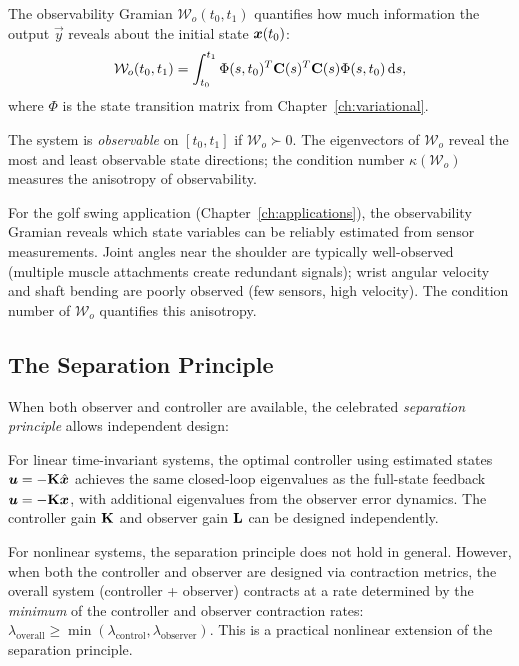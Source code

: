 The observability Gramian $\mathcal{W}_o(t_0, t_1)$ quantifies how much information the
output $\vec{y}$ reveals about the initial state $\bm{x}(t_0)$:
\begin{equation}
\mathcal{W}_o(t_0, t_1) = \int_{t_0}^{t_1} \Phi(s, t_0)^T \mathbf{C}(s)^T \mathbf{C}(s) \Phi(s, t_0) \, \mathrm{d} s,
\label{eq:ch6:obs-gramian}
\end{equation}
where $\Phi$ is the state transition matrix from Chapter~\ref{ch:variational}.

The system is \emph{observable} on $[t_0, t_1]$ if $\mathcal{W}_o \succ 0$. The
eigenvectors of $\mathcal{W}_o$ reveal the most and least observable state directions;
the condition number $\kappa(\mathcal{W}_o)$ measures the anisotropy of observability.

\begin{warningbox}
For the golf swing application (Chapter~\ref{ch:applications}), the observability
Gramian reveals which state variables can be reliably estimated from sensor measurements.
Joint angles near the shoulder are typically well-observed (multiple muscle attachments
create redundant signals); wrist angular velocity and shaft bending are poorly observed
(few sensors, high velocity). The condition number of $\mathcal{W}_o$ quantifies this
anisotropy.
\end{warningbox}

\subsection{The Separation Principle}

When both observer and controller are available, the celebrated \emph{separation principle}
allows independent design:

\begin{theorem}
\label{thm:ch6:separation}
For linear time-invariant systems, the optimal controller using estimated states
$\bm{u} = -\mathbf{K}\hat{\bm{x}}$ achieves the same closed-loop eigenvalues as the full-state
feedback $\bm{u} = -\mathbf{K}\bm{x}$, with additional eigenvalues from the observer error
dynamics. The controller gain $\mathbf{K}$ and observer gain $\mathbf{L}$ can be designed
independently.
\end{theorem}

For nonlinear systems, the separation principle does not hold in general. However,
when both the controller and observer are designed via contraction metrics, the
overall system (controller + observer) contracts at a rate determined by the
\emph{minimum} of the controller and observer contraction rates:
$\lambda_{\text{overall}} \geq \min(\lambda_{\text{control}}, \lambda_{\text{observer}})$.
This is a practical nonlinear extension of the separation principle.


